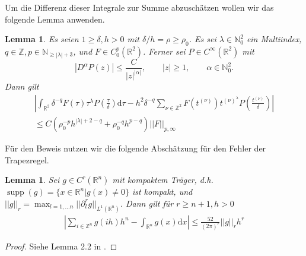 \documentclass[12pt,a4paper]{scrartcl}
\newtheorem{Lemma}[Satz]{Lemma}
\newcommand{\dd}{\mathrm{d}}
\numberwithin{equation}{section}
\newcommand{\R}{\mathbb{R}} %
\newcommand{\Z}{\mathbb{Z}} %
\newcommand{\N}{\mathbb{N}} %
\newcommand{\supp}{\operatorname{supp}}
\begin{document}
Um die Differenz dieser Integrale zur Summe abzuschätzen wollen wir das folgende Lemma anwenden.
\begin{Lemma} \label{epsdisk}
Es seien $ 1\geq \delta, h>0$ mit $\delta/h = \rho \geq \rho_0$. Es sei $\lambda \in \N_0^2$ ein Multiindex, $q\in \Z, p \in \N_{\geq |\lambda|+3}$, und $F \in C_0^p(\R^2)$. Ferner sei $P\in C^\infty(\R^2)$ mit 
\[
|D^\alpha P(z)| \leq \frac{C}{|z|^{|\alpha|}}, \qquad |z|\geq 1, \qquad \alpha \in \N_0^2.
\]
Dann gilt
\begin{align*}
\left|\int_{\R^2} \delta^{-q}F(\tau)\tau^\lambda P\left(\frac{\tau}{\delta}\right) \dd \tau - h^2 \delta^{-q} \sum_{\nu \in \Z^2}F(t^{(\nu)})t^{(\nu)^\lambda} P\left(\frac{t^{(\nu)}}{\delta}\right)\right| \\
\leq C( \rho_0^{-p}h^{|\lambda|+2-q}+\rho_0^{-q}h^{p-q})||F||_{p,\infty}
\end{align*}
\end{Lemma}
Für den Beweis nutzen wir die folgende Abschätzung für den Fehler der Trapezregel.
\begin{Lemma} \label{Lepsdisk}
Sei $g \in C^r(\R^n)$ mit kompaktem Träger, d.h. $\supp(g)=\{x\in \R^n | g(x) \neq 0 \}$ ist kompakt, und $||g||_r = \max_{l=1, \dots n}||\partial_l^r g ||_{L^1(\R^n)}$. Dann gilt für $r \geq n+1, h>0$
\begin{align}
\left|\sum_{i \in \Z^n}g(i h) h^n - \int_{\R^n}g(x) \dd x \right| \leq \frac{52}{(2\pi)^r}||g||_r h^r
\end{align}
\end{Lemma}
\begin{proof}
Siehe Lemma 2.2 in \cite{Anderson}.
\end{proof}
\end{document}
